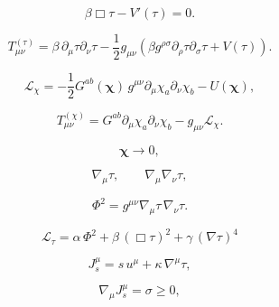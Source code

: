 \[
\beta \Box \tau - V'(\tau) = 0.
\]

\[
T^{(\tau)}_{\mu\nu}
=
\beta\, \partial_\mu\tau\partial_\nu\tau
-\frac{1}{2}g_{\mu\nu}
\left(
\beta g^{\rho\sigma}\partial_\rho\tau\partial_\sigma\tau
+ V(\tau)
\right).
\]

\[
\mathcal{L}_\chi
=
-\frac{1}{2}G^{ab}(\bm{\chi})\, g^{\mu\nu}\partial_\mu\chi_a\partial_\nu\chi_b
- U(\bm{\chi}),
\]

\[
T^{(\chi)}_{\mu\nu}
=
G^{ab}\partial_\mu\chi_a\partial_\nu\chi_b
- g_{\mu\nu}\mathcal{L}_\chi.
\]

\[
\bm{\chi} \to 0,
\]

\[
\nabla_\mu \tau,\qquad \nabla_\mu \nabla_\nu \tau,
\]

\[
\Phi^2 = g^{\mu\nu} \nabla_\mu \tau\, \nabla_\nu \tau.
\]

\[
\mathcal{L}_\tau = \alpha\, \Phi^2 + \beta\, (\Box \tau)^2 + \gamma\, (\nabla \tau)^4
\]

\[
J^\mu_s = s\, u^\mu + \kappa\, \nabla^\mu \tau,
\]

\[
\nabla_\mu J^\mu_s = \sigma \ge 0,
\]

